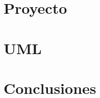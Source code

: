 \documentclass[11pt,fleqn]{book} %
\begin{document}
\part{Proyecto}


\part{UML}









\part{Conclusiones}










\end{document}
